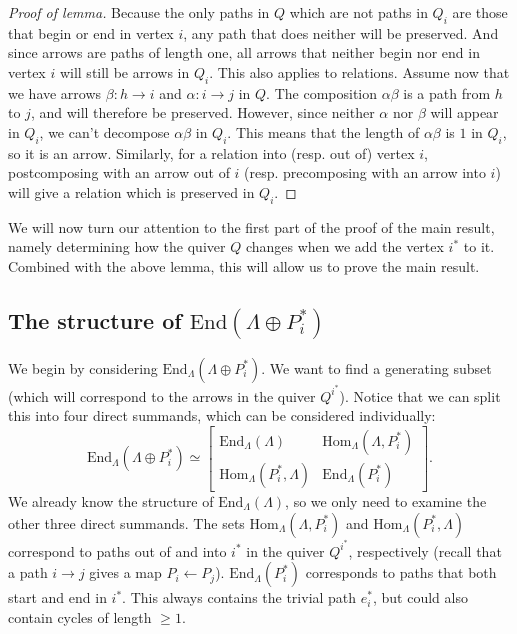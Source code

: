 \documentclass[12pt, dvipsnames, oneside]{amsart}
\theoremstyle{definition}
\newcommand{\Hom}{\text{Hom}}
\newcommand{\End}{\text{End}}
\begin{document}
\begin{proof}[Proof of lemma]
Because the only paths in $Q$ which are not paths in $Q_i$ are those that begin or end in vertex $i$, any path that does neither will be preserved. And since arrows are paths of length one, all arrows that neither begin nor end in vertex $i$ will still be arrows in $Q_i$. This also applies to relations. 
Assume now that we have arrows $\beta\colon h\rightarrow i$ and $\alpha\colon i\rightarrow j$ in $Q$. The composition $\alpha\beta$ is a path from $h$ to $j$, and will therefore be preserved. However, since neither $\alpha$ nor $\beta$ will appear in $Q_i$, we can't decompose $\alpha\beta$ in $Q_i$. This means that the length of $\alpha\beta$ is $1$ in $Q_i$, so it is an arrow. Similarly, for a relation into (resp. out of) vertex $i$, postcomposing with an arrow out of $i$ (resp. precomposing with an arrow into $i$) will give a relation which is preserved in $Q_i$. 

\end{proof}


\bigskip

We will now turn our attention to the first part of the proof of the main result, namely determining how the quiver $Q$ changes when we add the vertex $i^*$ to it. 
Combined with the above lemma, this will allow us to prove the main result.

\bigskip

\subsection*{The structure of \texorpdfstring{$\End(\Lambda\oplus P_i^*)$}{End(Λ⊕Pi*)}}
We begin by considering $\End_\Lambda(\Lambda\oplus P_i^*)$. We want to find a generating subset (which will correspond to the arrows in the quiver $Q^{i^*}$). Notice that we can split this into four direct summands, which can be considered individually:
$$\End_\Lambda(\Lambda\oplus P_i^*) \simeq \begin{bmatrix}\End_{\Lambda}(\Lambda)  & \Hom_{\Lambda}(\Lambda, P_i^*) \\ \Hom_{\Lambda}(P_i^*, \Lambda) & \End_{\Lambda}(P_i^*)\end{bmatrix}.$$ 
We already know the structure of $\End_\Lambda(\Lambda)$, so we only need to examine the other three direct summands. The sets $\Hom_\Lambda(\Lambda, P_i^*)$ and $\Hom_\Lambda(P_i^*,\Lambda)$ correspond to paths out of and into $i^*$ in the quiver $Q^{i^*}$, respectively (recall that a path $i\rightarrow j$ gives a map $P_i\leftarrow P_j$). $\End_{\Lambda}(P_i^*)$ corresponds to paths that both start and end in $i^*$. This always contains the trivial path $e_i^*$, but could also contain cycles of length $\geq 1$.
\end{document}
